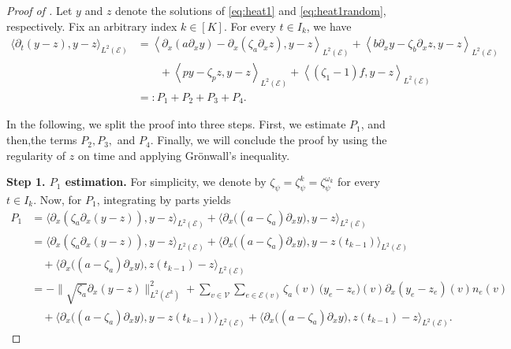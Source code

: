 \documentclass[10pt,a4paper]{amsart}
\begin{document}
\begin{proof}[Proof of  ]
    Let $y$ and $z$ denote the solutions of \eqref{eq:heat1} and \eqref{eq:heat1random}, respectively. Fix an arbitrary index $k \in [K]$. For every $t \in I_k$, we have
    \begin{align}\label{eq:ineq1}
      \langle \partial_t (y - z), y - z \rangle_{L^2(\mathcal{E})}
      &= \left\langle
           \partial_x(a\partial_x y)
           - \partial_x(\zeta_a\partial_x z),
           y - z
         \right\rangle_{L^2(\mathcal{E})} +
         \left\langle
           b\partial_x y
           - \zeta_b \partial_x z,
           y - z
         \right\rangle_{L^2(\mathcal{E})}\\
         &\qquad+
         \left\langle
           py
           - \zeta_pz,
           y - z
         \right\rangle_{L^2(\mathcal{E})}
         +
         \left\langle
           (\zeta_1 - 1) f,
           y - z
         \right\rangle_{L^2(\mathcal{E})}
      \nonumber \\
      &=: P_1 + P_2 + P_3 + P_4.
    \end{align}

    In the following, we split the proof into three steps. First, we estimate $P_1$, and then,the terms $P_2, P_3,$ and $P_4$. Finally, we will conclude the proof by using the regularity of $z$ on time and applying Gr\"onwall's inequality. 
\smallbreak
    
    \noindent
    {\bf Step 1. $P_1$ estimation. } For simplicity, we denote by $\zeta_\psi = \zeta_\psi^k = \zeta^{\omega_k}_\psi$ for every $t\in I_k$. Now, for $P_1$, integrating by parts yields
    \begin{align*}
      P_1 
      &= 
      \big\langle 
        \partial_x(\zeta_a\partial_x(y - z)), 
        y - z
      \big\rangle_{L^2(\mathcal{E})}
      +
      \big\langle
        \partial_x\bigl((a - \zeta_a)\partial_x y\bigr),
        y - z
      \big\rangle_{L^2(\mathcal{E})}
      \nonumber \\
      &=
      \big\langle 
        \partial_x(\zeta_a\partial_x(y - z)), 
        y - z
      \big\rangle_{L^2(\mathcal{E})}
      +
      \big\langle
        \partial_x\bigl((a - \zeta_a)\partial_x y\bigr),
        y - z(t_{k-1})
      \big\rangle_{L^2(\mathcal{E})}
      \nonumber \\
      &\quad
      +
      \big\langle
        \partial_x\bigl((a - \zeta_a)\partial_x y\bigr),
        z(t_{k-1}) - z
      \big\rangle_{L^2(\mathcal{E})}
      \nonumber \\
      &=
      -\bigl\|\sqrt{\zeta_a}\partial_x(y - z)\bigr\|_{L^2(\mathcal{E}^k)}^2
      +
      \sum_{v \in \mathcal{V}}
      \sum_{e \in \mathcal{E}(v)}
         \zeta_a(v)\,\bigl(y_e - z_e\bigr)(v)\partial_x(y_e - z_e)(v)n_e(v)
      \nonumber \\
      &\quad
      +
      \big\langle
        \partial_x\bigl((a - \zeta_a)\partial_x y\bigr),
        y - z(t_{k-1})
      \big\rangle_{L^2(\mathcal{E})}
      +
      \big\langle
        \partial_x\bigl((a - \zeta_a)\partial_x y\bigr),
        z(t_{k-1}) - z
      \big\rangle_{L^2(\mathcal{E})}.
    \end{align*}


\end{proof}
\end{document}
